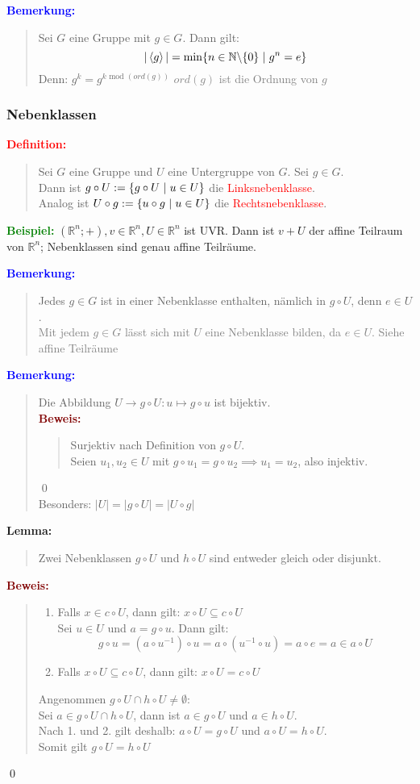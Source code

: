 \documentclass{article}
\newcommand{\smsp}{\phantom{\hspace{3px}}}
\newcommand{\red}[1]{\textcolor{red}{#1}}
\newcommand{\gray}[1]{\textcolor{gray}{#1}}
\newcommand{\blue}[1]{\textcolor{blue}{#1}}
\newcommand{\green}[1]{\textcolor{green}{#1}}
\newcommand{\dgr}[1]{\textcolor{dgr}{#1}}
\newcommand{\maroon}[1]{\textcolor{maroon}{#1}}
\newcommand{\ex}{\green{\textbf{Beispiel: }}}
\newcommand{\de}[1]{\red{\textbf{Definition: }}\begin{quote}#1\end{quote}}
\newcommand{\an}[1]{\blue{\textbf{Bemerkung: }}\begin{quote}#1\end{quote}}
\newcommand{\lem}[1]{\dgr{\textbf{Lemma: }}\begin{quote}#1\end{quote}}
\newcommand{\pr}[1]{\maroon{\textbf{Beweis: }}\begin{quote}#1\end{quote}\qed}
\newcommand{\N}{\mathbb{N}}
\newcommand{\R}{\mathbb{R}}
\renewcommand{\st}{\smsp | \smsp}
\renewcommand{\mod}{\text{ mod }}
\newcommand{\spann}[1]{\left\langle#1\right\rangle}
\begin{document}
\an{
    Sei $G$ eine Gruppe mit $g \in G$. Dann gilt:
    \[
        |\spann{g}| = \min\{n \in \N \backslash \{0\} \st g^n = e\}
    \]
    Denn: $g^k = g^{k \mod(ord(g))}$ \gray{$ord(g)$ ist die Ordnung von $g$}
}

\subsubsection{Nebenklassen}

\de{
    Sei $G$ eine Gruppe und $U$ eine Untergruppe von $G$. Sei $g \in G$.\\
    Dann ist $g \circ U := \{g \circ U \st u \in U\}$ die \red{Linksnebenklasse}.\\
    Analog ist $U \circ g := \{u \circ g \st u \in U\}$ die \red{Rechtsnebenklasse}.
}

\ex $(\R^n; +), v \in \R^n, U \in \R^n$ ist UVR. Dann ist $v + U$ der affine Teilraum von $\R^n$; Nebenklassen sind genau affine Teilräume.

\an{
    Jedes $g \in G$ ist in einer Nebenklasse enthalten, nämlich in $g \circ U$, denn $e \in U$.\\
    \gray{Mit jedem $g \in G$ lässt sich mit $U$ eine Nebenklasse bilden, da $e \in U$. Siehe affine Teilräume}
}

\an{
    Die Abbildung $U \to g \circ U: u \mapsto g \circ u$ ist bijektiv.\\
    \pr{
        Surjektiv nach Definition von $g \circ U$.\\
        Seien $u_1, u_2 \in U$ mit $g \circ u_1 = g \circ u_2 \implies u_1 = u_2$, also injektiv.
    }\\
    Besonders: $|U| = |g \circ U| = |U \circ g|$
}

\lem{
    Zwei Nebenklassen $g \circ U$ und $h \circ U$ sind entweder gleich oder disjunkt.
}

\pr{
    \begin{enumerate}
        \item Falls $x \in c \circ U$, dann gilt: $x \circ U \subseteq c \circ U$\\
        Sei $u \in U$ und $a = g \circ u$. Dann gilt:
        \[
            g \circ u = (a \circ u^{-1}) \circ u = a \circ (u^{-1} \circ u) = a \circ e = a \in a \circ U
        \]
        \item Falls $x \circ U \subseteq c \circ U$, dann gilt: $x \circ U = c \circ U$
    \end{enumerate}

    Angenommen $g \circ U \cap h \circ U \ne \emptyset$:\\
    Sei $a \in g \circ U \cap h \circ U$, dann ist $a \in g \circ U$ und $a \in h \circ U$.\\
    Nach 1. und 2. gilt deshalb: $a \circ U = g \circ U$ und $a \circ U = h \circ U$.\\
    Somit gilt $g \circ U = h \circ U$
}
\end{document}
